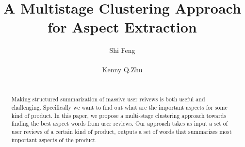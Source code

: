 \documentclass{acm_proc_article-sp}
\begin{document}
\title{A Multistage Clustering Approach for Aspect Extraction}


\author{
\alignauthor
Shi Feng \\
       \\
\alignauthor
Kenny Q.Zhu \\
       \\
}

\maketitle
\begin{abstract}
Making structured summarization of massive user reivews is both useful and challenging. Specifically we want to find out what are the important aspects for some kind of product. In this paper, we propose a multi-stage clustering approach towards finding the best aspect words from user reviews. Our approach takes as input a set of user reviews of a certain kind of product, outputs a set of words that summarizes most important aspects of the product.
\end{abstract}










\begin{thebibliography}{1}
\end{thebibliography}

\balancecolumns
\end{document}
